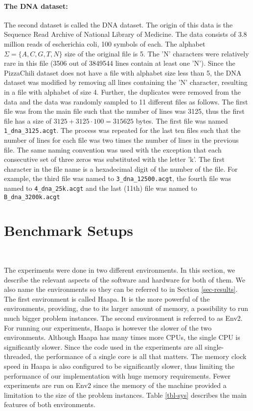 \documentclass[english,twoside,censored,csm,algorithms-track-2020]{HYthesisML}
\theoremstyle{plain}
\theoremstyle{definition}
\begin{document}
\paragraph{The DNA dataset:}
The second dataset is called the DNA dataset. The origin of this data is the Sequence Read Archive
of National Library of Medicine. The data consists of 3.8 million reads of escherichia coli,
100 symbols of each.
 The alphabet $\Sigma=\{A,C,G,T,N\}$ size of the original file is 5.
The 'N' characters were relatively rare in this file (3506 out of 3849544 lines contain at least one 'N').
Since the PizzaChili dataset does not have a
file with alphabet size less than 5, the DNA dataset was modified by removing all lines containing
the 'N' character, resulting in a file with alphabet of size 4.
Further, the duplicates were removed from the data and the data was randomly sampled to 11 different
files as follows. The first file was from the main file such that the number of lines was 3125, thus
the first file has a size of $3125+3125\cdot 100 = 315625$ bytes. The first file was named
\texttt{1\_dna\_3125.acgt}. The process was repeated for the last ten files such that the number
of lines for each file was two times the number of lines in the previous file.
The same naming convention
was used with the exception that each consecutive set of three zeros was substituted with the letter 'k'.
The first character in the file name is a hexadecimal digit of the number of the file.
For example, the third file was named to \texttt{3\_dna\_12500.acgt}, the fourth file was named
to \texttt{4\_dna\_25k.acgt} and the last (11th) file was named to \texttt{B\_dna\_3200k.acgt}

\section{Benchmark Setups}~\label{sec-env}

The experiments were done in two different environments. In this section, we describe the relevant
aspects of the software and hardware for both of them. We also name the environments so they
can be referred to in Section \ref{sec-results}. The first environment is called Haapa. It is the more
powerful of the environments, providing, due to its larger amount of memory, a possibility to run
much bigger problem instances. The second
environment is referred to as Env2. For running
our experiments, Haapa is however the slower of the two environments. Although Haapa has many times
more CPUs, the single CPU is significantly slower. Since the code used in the experiments
are all single-threaded, the performance of a single core is all that matters. The memory
clock speed in Haapa is also configured to be significantly slower, thus limiting the performance
of our implementation with huge memory requirements. Fewer experiments are run on Env2 since the
memory of the machine provided a limitation to the size of the problem instances.
Table \ref{tbl-sys} describes the main features of both environments.
\end{document}
